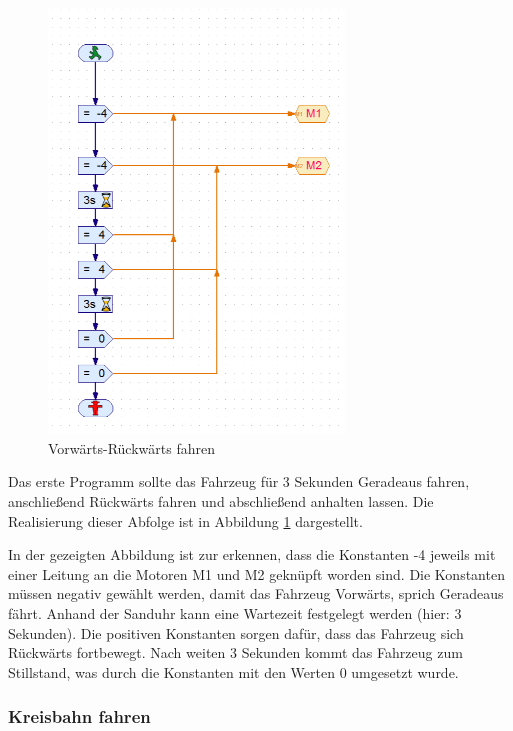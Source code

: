 \documentclass[a4paper, 12pt]{article}
\begin{document}
\begin{figure}[H]
  \centering
  \includegraphics[width=0.7\textwidth]{images/abb_auf52a.PNG}
  \caption{Vorwärts-Rückwärts fahren}
  \label{fig:VRfahren}
  \end{figure}
  
Das erste Programm sollte das Fahrzeug für 3 Sekunden Geradeaus fahren, anschließend Rückwärts fahren und abschließend anhalten lassen. Die Realisierung dieser Abfolge ist in Abbildung \ref{fig:VRfahren} dargestellt.

In der gezeigten Abbildung ist zur erkennen, dass die Konstanten -4 jeweils mit einer Leitung an die Motoren M1 und M2 geknüpft worden sind. Die Konstanten müssen negativ gewählt werden, damit das Fahrzeug Vorwärts, sprich Geradeaus fährt. Anhand der Sanduhr kann eine \glqq Wartezeit\grqq{} festgelegt werden (hier: 3 Sekunden). Die positiven Konstanten sorgen dafür, dass das Fahrzeug sich Rückwärts fortbewegt. Nach weiten 3 Sekunden kommt das Fahrzeug zum Stillstand, was durch die Konstanten mit den Werten 0 umgesetzt wurde.



\subsubsection*{Kreisbahn fahren}
\end{document}
